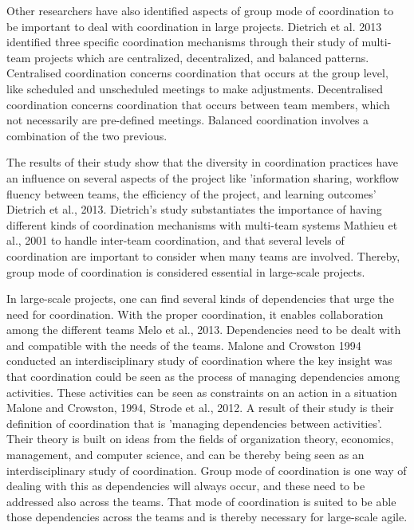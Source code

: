 Other researchers have also identified aspects of group mode of coordination to be important to deal with coordination in large projects. Dietrich et al. 2013 identified three specific coordination mechanisms through their study of multi-team projects which are centralized, decentralized, and balanced patterns. Centralised coordination concerns coordination that occurs at the group level, like scheduled and unscheduled meetings to make adjustments. Decentralised coordination concerns coordination that occurs between team members, which not necessarily are pre-defined meetings. Balanced coordination involves a combination of the two previous.

The results of their study show that the diversity in coordination practices have an influence on several aspects of the project like ’information sharing, workflow fluency between teams, the efficiency of the project, and learning outcomes’ Dietrich et al., 2013. Dietrich’s study substantiates the importance of having different kinds of coordination mechanisms with multi-team systems Mathieu et al., 2001 to handle inter-team coordination, and that several levels of coordination are important to consider when many teams are involved. Thereby, group mode of coordination is considered essential in large-scale projects.

In large-scale projects, one can find several kinds of dependencies that urge the need for coordination. With the proper coordination, it enables collaboration among the different teams Melo et al., 2013. Dependencies need to be dealt with and compatible with the needs of the teams. Malone and Crowston 1994 conducted an interdisciplinary study of coordination where the key insight was that coordination could be seen as the process of managing dependencies among activities. These activities can be seen as constraints on an action in a situation Malone and Crowston, 1994, Strode et al., 2012. A result of their study is their definition of coordination that is ’managing dependencies between activities’. Their theory is built on ideas from the fields of organization theory, economics, management, and computer science, and can be thereby being seen as an interdisciplinary study of coordination. Group mode of coordination is one way of dealing with this as dependencies will always occur, and these need to be addressed also across the teams. That mode of coordination is suited to be able those dependencies across the teams and is thereby necessary for large-scale agile.

